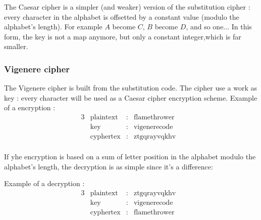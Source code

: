 The Caesar cipher is a simpler (and weaker) version of the substitution cipher : every character in the alphabet is offsetted by a constant value (modulo the alphabet's length). For example $A$ become $C$, $B$ become $D$, and so one... In this form, the key is not a map anymore, but only a constant integer,which is far smaller. 

\newpage
\begin{minipage}[c]{\linewidth}
    
\end{minipage}
\vfill


\subsubsection{ Vigenere cipher }

The  Vigenere cipher is built from the substitution code. The cipher use a work as key : every character will be used as a Caesar cipher encryption scheme. 
Example of a encryption : 
\begin{alignat*}{3}
    &\text{plaintext}   & : & \text{flamethrower}&  \\
    &\text{key}         & : & \text{vigenerecode}&  \\
    &\text{cyphertex}   & : & \text{ztgqrayvqkhv}&  \\ 
\end{alignat*}

If yhe encryption is based on a sum of letter position in the alphabet modulo the alphabet's length, the decryption is as simple since it's a difference: 

Example of a decryption : 
\begin{alignat*}{3}
    &\text{plaintext}   & : & \text{ztgqrayvqkhv}&  \\
    &\text{key}         & : & \text{vigenerecode}&  \\
    &\text{cyphertex}   & : & \text{flamethrower}&  \\ 
\end{alignat*}

